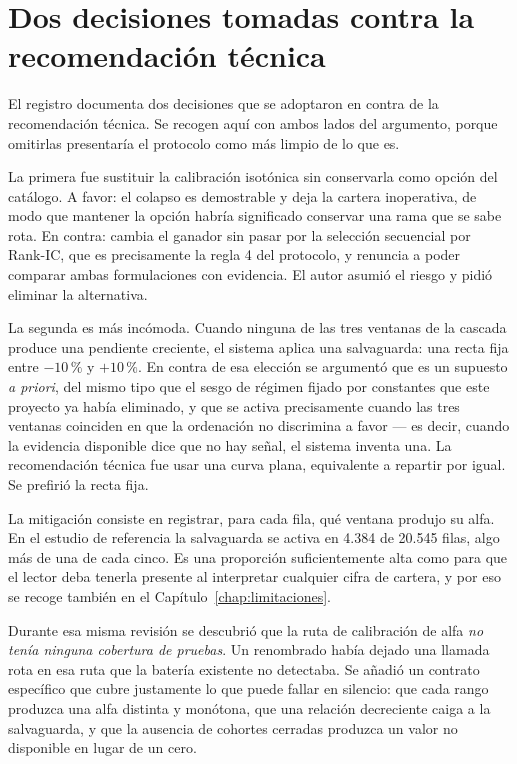 \section{Dos decisiones tomadas contra la recomendación técnica}

El registro documenta dos decisiones que se adoptaron en contra de la recomendación técnica. Se
recogen aquí con ambos lados del argumento, porque omitirlas presentaría el protocolo como más
limpio de lo que es.

La primera fue sustituir la calibración isotónica sin conservarla como opción del catálogo. A favor:
el colapso es demostrable y deja la cartera inoperativa, de modo que mantener la opción habría
significado conservar una rama que se sabe rota. En contra: cambia el ganador sin pasar por la
selección secuencial por Rank-IC, que es precisamente la regla 4 del protocolo, y renuncia a poder
comparar ambas formulaciones con evidencia. El autor asumió el riesgo y pidió eliminar la
alternativa.

La segunda es más incómoda. Cuando ninguna de las tres ventanas de la cascada produce una pendiente
creciente, el sistema aplica una salvaguarda: una recta fija entre $-10\,\%$ y $+10\,\%$. En contra
de esa elección se argumentó que es un supuesto \emph{a priori}, del mismo tipo que el sesgo de
régimen fijado por constantes que este proyecto ya había eliminado, y que se activa precisamente
cuando las tres ventanas coinciden en que la ordenación no discrimina a favor --- es decir, cuando
la evidencia disponible dice que no hay señal, el sistema inventa una. La recomendación técnica fue
usar una curva plana, equivalente a repartir por igual. Se prefirió la recta fija.

La mitigación consiste en registrar, para cada fila, qué ventana produjo su alfa. En el estudio de
referencia la salvaguarda se activa en 4.384 de 20.545 filas, algo más de una de cada cinco. Es una
proporción suficientemente alta como para que el lector deba tenerla presente al interpretar
cualquier cifra de cartera, y por eso se recoge también en el Capítulo~\ref{chap:limitaciones}.

Durante esa misma revisión se descubrió que la ruta de calibración de alfa \emph{no tenía ninguna
cobertura de pruebas}. Un renombrado había dejado una llamada rota en esa ruta que la batería
existente no detectaba. Se añadió un contrato específico que cubre justamente lo que puede fallar en
silencio: que cada rango produzca una alfa distinta y monótona, que una relación decreciente caiga a
la salvaguarda, y que la ausencia de cohortes cerradas produzca un valor no disponible en lugar de
un cero.

